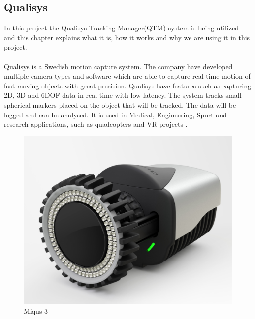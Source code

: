 \subsection{Qualisys}
In this project the Qualisys Tracking Manager(QTM) system is being utilized and this chapter explains what it is, how it works and why we are using it in this project. \\
\\
Qualisys is a Swedish motion capture system. The company have developed multiple camera types and software which are able to capture real-time motion of fast moving objects with great precision. Qualisys have features such as capturing 2D, 3D and 6DOF data in real time with low latency. The system tracks small spherical markers placed on the object that will be tracked. The data will be logged and can be analysed. It is used in Medical, Engineering, Sport and research applications, such as quadcopters and VR projects \cite{QTM}.

\begin{figure}[h]
          \centering
            \includegraphics[scale = 0.33]{VAPIQ-PICTURES/m3.png}
                \caption{Miqus 3}
                \label{m3}
            \label{dir}
\end{figure}

